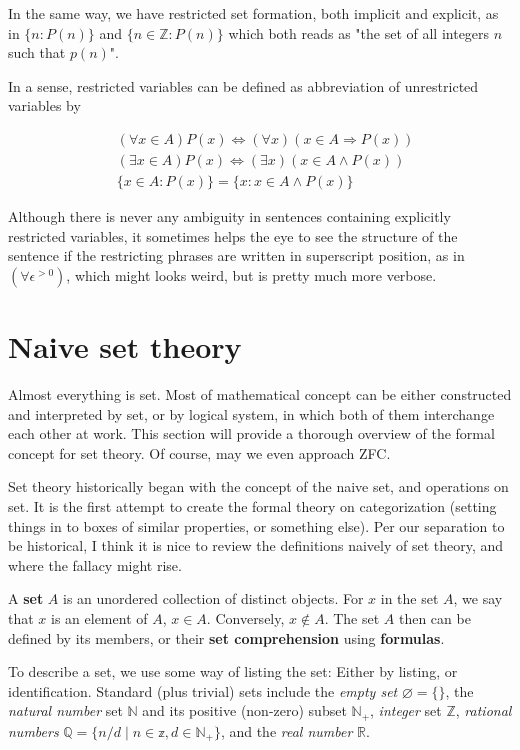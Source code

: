 In the same way, we have restricted set formation, both implicit and explicit, as in $\{n: P(n)\}$ and $\{n\in\mathbb{Z}: P(n)\}$ which both reads as "the set of all integers $n$ such that $p(n)$".

In a sense, restricted variables can be defined as abbreviation of unrestricted variables by 

\begin{align*}
    & (\forall x\in A)P(x) \Leftrightarrow (\forall x)(x\in A \Rightarrow P(x)) \\
    & (\exists x \in A)P(x) \Leftrightarrow (\exists x)( x\in A \land P(x))\\
    & \{x\in A: P(x)\} = \{x: x\in A \land P(x)\}
\end{align*}

Although there is never any ambiguity in sentences containing explicitly restricted variables, it sometimes helps the eye to see the structure of the sentence if the restricting phrases are written in superscript position, as in $(\forall \epsilon^{>0})$, which might looks weird, but is pretty much more verbose. 


\section{Naive set theory}

Almost everything is set. Most of mathematical concept can be either constructed and interpreted by set, or by logical system, in which both of them interchange each other at work. This section will provide a thorough overview of the formal concept for set theory. Of course, may we even approach ZFC. 

Set theory historically began with the concept of the naive set, and operations on set. It is the first attempt to create the formal theory on categorization (setting things in to boxes of similar properties, or something else). Per our separation to be historical, I think it is nice to review the definitions naively of set theory, and where the fallacy might rise.
\begin{definition}[Set]
    A \textbf{set} $A$ is an unordered collection of distinct objects. For $x$ in the set $A$, we say that $x$ is an element of $A$, $x\in A$. Conversely, $x\notin A$. The set $A$ then can be defined by its members, or their \textbf{set comprehension} using \textbf{formulas}. 
\end{definition}

To describe a set, we use some way of listing the set: Either by listing, or identification. Standard (plus trivial) sets include the \textit{empty set} $\varnothing = \{\}$, the \textit{natural number} set $\mathbb{N}$ and its positive (non-zero) subset $\mathbb{N}_{+}$, \textit{integer} set $\mathbb{Z}$, \textit{rational numbers} $\mathbb{Q}= \{n/d\mid n\in \mathbb{z}, d\in \mathbb{N}_{+}\}$, and the \textit{real number} $\mathbb{R}$.  

